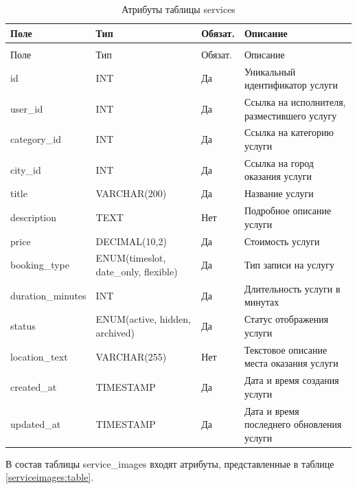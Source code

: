 \begin{longtable}{|>{\raggedright\arraybackslash}p{3.8cm}|>{\raggedright\arraybackslash}p{3.8cm}|>{\centering\arraybackslash}p{2.0cm}|>{\raggedright\arraybackslash}p{5.4cm}|}
	\caption{Атрибуты таблицы services}\label{services:table} \\ \hline
	\centering Поле & \centering Тип & \centering Обязат. & \centering\arraybackslash Описание \\ \hline
	\endfirsthead
	\multicolumn{4}{l}{Продолжение таблицы \ref{services:table}} \\ \hline
	\centering Поле & \centering Тип & \centering Обязат. & \centering\arraybackslash Описание \\ \hline
	\endhead
	id & INT & Да & Уникальный идентификатор услуги \\ \hline
	user\_id & INT & Да & Ссылка на исполнителя, разместившего услугу \\ \hline
	category\_id & INT & Да & Ссылка на категорию услуги \\ \hline
	city\_id & INT & Да & Ссылка на город оказания услуги \\ \hline
	title & VARCHAR(200) & Да & Название услуги \\ \hline
	description & TEXT & Нет & Подробное описание услуги \\ \hline
	price & DECIMAL(10,2) & Да & Стоимость услуги \\ \hline
	booking\_type & ENUM(timeslot, date\_only, flexible) & Да & Тип записи на услугу \\ \hline
	duration\_minutes & INT & Да & Длительность услуги в минутах \\ \hline
	status & ENUM(active, hidden, archived) & Да & Статус отображения услуги \\ \hline
	location\_text & VARCHAR(255) & Нет & Текстовое описание места оказания услуги \\ \hline
	created\_at & TIMESTAMP & Да & Дата и время создания услуги \\ \hline
	updated\_at & TIMESTAMP & Да & Дата и время последнего обновления услуги \\ \hline
\end{longtable}

В состав таблицы service\_images входят атрибуты, представленные в таблице \ref{serviceimages:table}.

